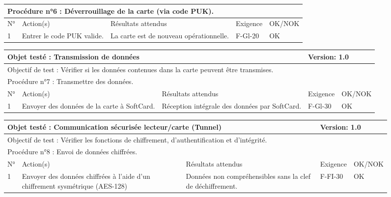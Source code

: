 \documentclass[a4paper,11pt,french]{article}
\begin{document}
\begin{figure}[!h]
\begin{tabular}{|p{1cm}|p{5cm}|p{5cm}|p{2cm}|p{2cm}|}
\hline
\multicolumn{5}{|l|}{Procédure n°6 : Déverrouillage de la carte (via code PUK).} \\
\hline
N° & Action(s) & Résultats attendus & Exigence & OK/NOK \\
\hline
1 & Entrer le code PUK valide. & La carte est de nouveau opérationnelle. & F-Gl-20 & OK \\
\hline
\end{tabular}
\end{figure}


\newpage

\begin{figure}[!h]
\begin{tabular}{|p{1cm}|p{5cm}|p{5cm}|p{2cm}|p{2cm}|}
\hline
\multicolumn{3}{|l|}{Objet testé : Transmission de données} & \multicolumn{2}{|l|}{Version: 1.0} \\
\hline
\multicolumn{5}{|l|}{Objectif de test : Vérifier si les données contenues dans la carte peuvent être transmises.} \\
\hline
\multicolumn{5}{|l|}{Procédure n°7 : Transmettre des données.} \\
\hline
N° & Action(s) & Résultats attendus & Exigence & OK/NOK \\
\hline
1 & Envoyer des données de la carte à SoftCard. & Réception intégrale des données par SoftCard. & F-Gl-30 & OK \\
\hline
\end{tabular}
\end{figure}


\newpage

\begin{figure}[!h]
\begin{tabular}{|p{1cm}|p{5cm}|p{5cm}|p{2cm}|p{2cm}|}
\hline
\multicolumn{3}{|l|}{Objet testé : Communication sécurisée lecteur/carte (Tunnel)} & \multicolumn{2}{|l|}{Version: 1.0} \\
\hline
\multicolumn{5}{|l|}{Objectif de test : Vérifier les fonctions de chiffrement, d'authentification et d'intégrité.} \\
\hline
\multicolumn{5}{|l|}{Procédure n°8 : Envoi de données chiffrées.} \\
\hline
N° & Action(s) & Résultats attendus & Exigence & OK/NOK \\
\hline
1 & Envoyer des données chiffrées à l'aide d'un chiffrement sysmétrique (AES-128) & Données non compréhensibles sans la clef de déchiffrement. & F-FI-30 & OK \\
\hline
\end{tabular}
\end{figure}
\end{document}
